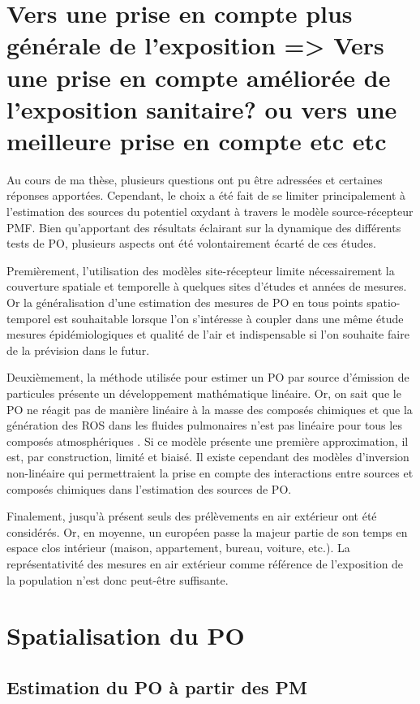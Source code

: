 
\section{Vers une prise en compte plus générale de l'exposition  => Vers une prise en compte améliorée de l'exposition sanitaire? ou vers une meilleure prise en compte etc etc }%

Au cours de ma thèse, plusieurs questions ont pu être adressées et certaines réponses
apportées.  Cependant, le choix a été fait de se limiter principalement à l'estimation
des sources du potentiel oxydant à travers le modèle source-récepteur PMF. Bien qu'apportant des résultats éclairant sur
la dynamique des différents tests de PO, plusieurs aspects ont été volontairement écarté de ces études.

Premièrement, l'utilisation des modèles site-récepteur limite nécessairement la couverture
spatiale et temporelle à quelques sites d'études et années de mesures. Or la
généralisation d'une estimation des mesures de PO en tous points spatio-temporel est
souhaitable lorsque l'on s'intéresse à coupler dans une même étude mesures
épidémiologiques et qualité de l'air et indispensable si l'on souhaite faire de la prévision dans le futur.

Deuxièmement, la méthode utilisée pour estimer un PO par source d'émission de particules présente un
développement mathématique linéaire. Or, on sait que le PO ne réagit pas de manière
linéaire à la masse des composés chimiques et que la génération des ROS dans les fluides pulmonaires n'est pas linéaire pour tous les composés atmosphériques . Si ce modèle présente une première
approximation, il est, par construction, limité et biaisé.  Il existe cependant des
modèles d'inversion non-linéaire qui permettraient la prise en compte des interactions
entre sources et composés chimiques dans l'estimation des sources de PO.

Finalement, jusqu'à présent seuls des prélèvements en air extérieur ont été considérés. Or, en moyenne, un européen passe la majeur partie de son temps en espace clos intérieur (maison,
appartement, bureau, voiture, etc.).  La représentativité des mesures en air extérieur
comme référence de l'exposition de la population n'est donc peut-être suffisante.

\section{Spatialisation du PO}

\subsection{Estimation du PO à partir des PM}

